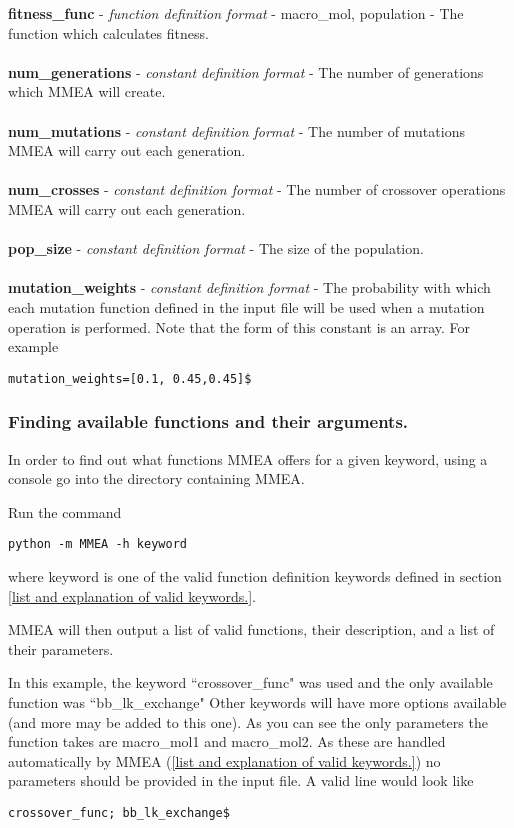 \documentclass{article}
\begin{document}
\textbf{fitness\_func} - \textit{function definition format} - macro\_mol, population - The function which calculates fitness.
\\
\\
\textbf{num\_generations} - \textit{constant definition format} - The number of generations which MMEA will create.
\\
\\
\textbf{num\_mutations} - \textit{constant definition format} - The number of mutations MMEA will carry out each generation.
\\
\\
\textbf{num\_crosses} - \textit{constant definition format} - The number of crossover operations MMEA will carry out each generation.
\\
\\
\textbf{pop\_size} - \textit{constant definition format} - The size of the population.
\\
\\
\textbf{mutation\_weights} - \textit{constant definition format} - The probability with which each mutation function defined in the input file will be used when a mutation operation is performed. Note that the form of this constant is an array. For example
\begin{verbatim}
mutation_weights=[0.1, 0.45,0.45]$
\end{verbatim}

\subsubsection{Finding available functions and their arguments.}
In order to find out what functions MMEA offers for a given keyword, using a console go into the directory containing MMEA. 

Run the command 
\begin{verbatim}
python -m MMEA -h keyword
\end{verbatim}
where keyword is one of the valid function definition keywords defined in section \ref{list and explanation of valid keywords.}.

MMEA will then output a list of valid functions, their description, and a list of their parameters.


In this example, the keyword ``crossover\_func" was used and the only available function was ``bb\_lk\_exchange" Other keywords will have more options available (and more may be added to this one). As you can see the only parameters the function takes are macro\_mol1 and macro\_mol2. As these are handled automatically by MMEA (\ref{list and explanation of valid keywords.}) no parameters should be provided in the input file. A valid line would look like
\begin{verbatim}
crossover_func; bb_lk_exchange$
\end{verbatim}
\end{document}
